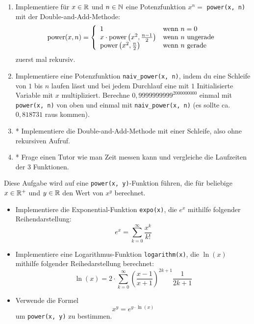 \documentclass{uebungszettel}
\begin{document}
\begin{aufg}
\begin{enumerate}[leftmargin=*]
\item Implementiere für $x \in \mathbb{R}$ und $n \in \mathbb{N}$ eine Potenzfunktion $x^n=$ \verb|power(x, n)| mit der Double-and-Add-Methode: \[
	\mathrm{power}(x, n) = \left\{ \begin{array}{ll}
	1 & \text{wenn } n = 0 \\
	x \cdot \mathrm{power}\left(x^2, \frac{n-1}{2}\right) & \text{wenn } n \text{ ungerade} \\
	\mathrm{power}\left(x^2, \frac{n}{2}\right) & \text{wenn } n \text{ gerade} \\
	\end{array}
	\right.
\]
zuerst mal rekursiv. 
\item Implementiere eine Potenzfunktion \verb|naiv_power(x, n)|, indem du eine Schleife von $1$ bis $n$ laufen lässt und bei jedem Durchlauf eine mit $1$ Initialisierte Variable mit $x$ multipliziert. Berechne $0,9999999999^{2000000000}$ einmal mit \verb|power(x, n)| von oben und einmal mit \verb|naiv_power(x, n)| (es sollte ca. $0,818731$ raus kommen). 
\item* Implementiere die Double-and-Add-Methode mit einer Schleife, also ohne rekursiven Aufruf.
\item* Frage einen Tutor wie man Zeit messen kann und vergleiche die Laufzeiten der 3 Funktionen.
\end{enumerate}
\end{aufg}

\begin{aufg}
Diese Aufgabe wird auf eine \verb|power(x, y)|-Funktion führen, die für beliebige $x \in \mathbb{R}^+$ und $y \in \mathbb{R}$ den Wert von $x^y$ berechnet.
\begin{itemize}
\item Implementiere die Exponential-Funktion \verb|expo(x)|, die $e^x$ mithilfe folgender Reihendarstellung: \[
e^x = \sum_{k=0}^\infty \frac{x^k}{k!} \]
\item Implementiere eine Logarithmus-Funktion \verb|logarithm(x)|, die $\ln(x)$ mithilfe folgender Reihedarstellung berechnet: \[
\ln(x) = 2\cdot \sum_{k = 0}^\infty \left(\frac{x-1}{x+1}\right)^{2k + 1} \frac{1}{2k + 1} \]
\item Verwende die Formel \[
x^y = e^{y \cdot \ln(x)} \] um \verb|power(x, y)| zu bestimmen.
\end{itemize}
\end{aufg}
\end{document}
